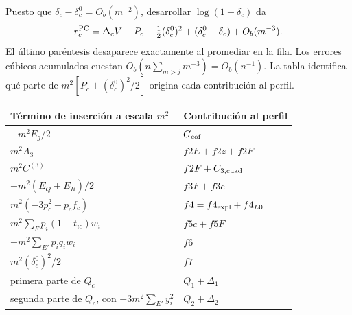 

Puesto que \(\delta_c-\delta_c^0=O_b(m^{-2})\), desarrollar \(\log(1+\delta_c)\) da
\[
 r_c^{\rm PC}=\Delta_c V+P_c+\tfrac12(\delta_c^0)^2
                   +(\delta_c^0-\delta_c)+O_b(m^{-3}).
\]
El último paréntesis desaparece exactamente al promediar en la fila. Los errores cúbicos
acumulados cuestan \(O_b(n\sum_{m>j}m^{-3})=O_b(n^{-1})\). La tabla identifica qué
parte de \(m^2[P_c+(\delta_c^0)^2/2]\) origina cada contribución al perfil.
\begin{center}\small
\begin{tabular}{ll}
\toprule
Término de inserción a escala \(m^2\) & Contribución al perfil\\ \midrule
\(-m^2 E_g/2\)& \(G_{\rm cof}\)\\
\(m^2 A_3\)&\(f2E+f2z+f2F\)\\
\(m^2 C^{(3)}\)&\(f2F+C_{3,\rm cuad}\)\\
\(-m^2(E_Q+E_R)/2\)&\(f3F+f3c\)\\
\(m^2(-3p_c^2+p_c f_c)\)&\(f4=f4_{\rm expl}+f4_{L0}\)\\
\(m^2\sum_F p_i(1-t_{ic})w_i\)&\(f5c+f5F\)\\
\(-m^2\sum_{E'}p_iq_iw_i\)&\(f6\)\\
\(m^2(\delta_c^0)^2/2\)&\(f7\)\\
primera parte de \(Q_c\)&\(Q_1+\Delta_1\)\\
segunda parte de \(Q_c\), con \(-3m^2\sum_{E'}y_i^2\)&\(Q_2+\Delta_2\)\\
\bottomrule
\end{tabular}
\end{center}


